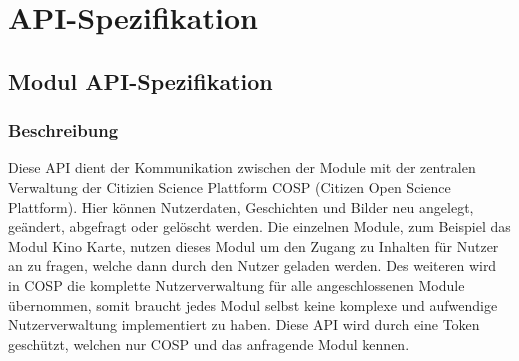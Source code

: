\chapter{API-Spezifikation}
\section{Modul API-Spezifikation}\label{api}
\subsection{Beschreibung}Diese API dient der Kommunikation zwischen der Module mit der zentralen Verwaltung der Citizien Science Plattform {\glqq COSP\grqq} ({\glqq Citizen Open Science Plattform\grqq}). Hier können Nutzerdaten, Geschichten und Bilder neu angelegt, geändert, abgefragt oder gelöscht werden. Die einzelnen Module, zum Beispiel das Modul {\glqq Kino Karte\grqq}, nutzen dieses Modul um den Zugang zu Inhalten für Nutzer an zu fragen, welche dann durch den Nutzer geladen werden. Des weiteren wird in {\glqq COSP\grqq} die komplette Nutzerverwaltung für alle angeschlossenen Module übernommen, somit braucht jedes Modul selbst keine komplexe und aufwendige Nutzerverwaltung implementiert zu haben. Diese API wird durch eine Token geschützt, welchen nur {\glqq COSP\grqq} und das anfragende Modul kennen.
